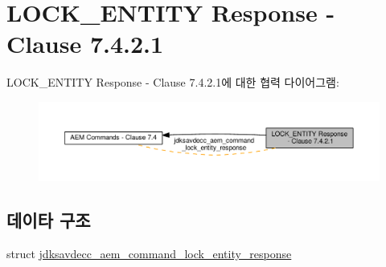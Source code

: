 \hypertarget{group__command__lock__entity__response}{}\section{L\+O\+C\+K\+\_\+\+E\+N\+T\+I\+TY Response -\/ Clause 7.4.2.1}
\label{group__command__lock__entity__response}
L\+O\+C\+K\+\_\+\+E\+N\+T\+I\+TY Response -\/ Clause 7.4.2.1에 대한 협력 다이어그램\+:
\nopagebreak
\begin{figure}[H]
\begin{center}
\leavevmode
\includegraphics[width=350pt]{group__command__lock__entity__response}
\end{center}
\end{figure}
\subsection*{데이타 구조}
\begin{DoxyCompactItemize}
\item 
struct \hyperlink{structjdksavdecc__aem__command__lock__entity__response}{jdksavdecc\+\_\+aem\+\_\+command\+\_\+lock\+\_\+entity\+\_\+response}
\end{DoxyCompactItemize}
